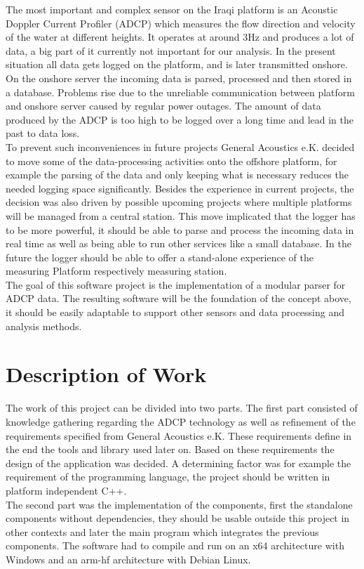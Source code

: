 The most important and complex sensor on the Iraqi platform is an Acoustic Doppler Current Profiler (ADCP) which measures the flow direction and velocity of the water at different heights. It operates at around 3Hz and produces a lot of data, a big part of it currently not important for our analysis. In the present situation all data gets logged on the platform, and is later transmitted onshore. On the onshore server the incoming data is parsed, processed and then stored in a database. Problems rise due to the unreliable communication between platform and onshore server caused by regular power outages. The amount of data produced by the ADCP is too high to be logged over a long time and lead in the past to data loss.\\\newline
To prevent such inconveniences in future projects General Acoustics e.K. decided to move some of the data-processing activities onto the offshore platform, for example the parsing of the data and only keeping what is necessary reduces the needed logging space significantly. Besides the experience in current projects, the decision was also driven by possible upcoming projects where multiple platforms will be managed from a central station. This move implicated that the logger has to be more powerful, it should be able to parse and process the incoming data in real time as well as being able to run other services like a small database. In the future the logger should be able to offer a stand-alone experience of the measuring Platform respectively measuring station.\\\newline
The goal of this software project is the implementation of a modular parser for ADCP data. The resulting software will be the foundation of the concept above, it should be easily adaptable to support other sensors and data processing and analysis methods. 

\section{Description of Work}
The work of this project can be divided into two parts. The first part consisted of knowledge gathering regarding the ADCP technology as well as refinement of the requirements specified from General Acoustics e.K. These requirements define in the end the tools and library used later on. Based on these requirements the design of the application was decided. A determining factor was for example the requirement of the programming language, the project should be written in platform independent C++.\\
The second part was the implementation of the components, first the standalone components without dependencies, they should be usable outside this project in other contexts and later the main program which integrates the previous components. The software had to compile and run on an x64 architecture with Windows and an arm-hf architecture with Debian Linux.

